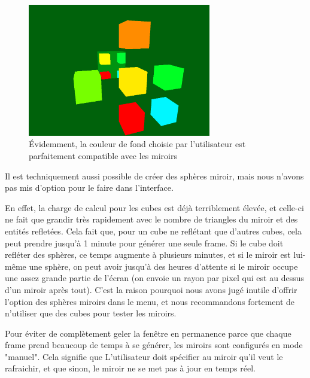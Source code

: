 \begin{figure}[h]
	\centering
	\includegraphics[width=8cm]{fig/CubeReflectionBackground.png}
	\caption{Évidemment, la couleur de fond choisie par l'utilisateur est parfaitement compatible avec les miroirs}
	\label{fig:propriete}
\end{figure}

\smallskip

Il est techniquement aussi possible de créer des sphères miroir, mais nous n'avons pas mis d'option pour le faire dans l'interface.

\smallskip

En effet, la charge de calcul pour les cubes est déjà terriblement élevée, et celle-ci ne fait que grandir très rapidement avec le nombre de triangles du miroir et des entités refletées. Cela fait que, pour un cube ne reflétant que d'autres cubes, cela peut prendre jusqu'à 1 minute pour générer une seule frame. Si le cube doit refléter des sphères, ce temps augmente à plusieurs minutes, et si le miroir est lui-même une sphère, on peut avoir jusqu'à des heures d'attente si le miroir occupe une assez grande partie de l'écran (on envoie un rayon par pixel qui est au dessus d'un miroir après tout). C'est la raison pourquoi nous avons jugé inutile d'offrir l'option des sphères miroirs dans le menu, et nous recommandons fortement de n'utiliser que des cubes pour tester les miroirs.

\smallskip

Pour éviter de complètement geler la fenêtre en permanence parce que chaque frame prend beaucoup de temps à se générer, les miroirs sont configurés en mode "manuel". Cela signifie que L'utilisateur doit spécifier au miroir qu'il veut le rafraichir, et que sinon, le miroir ne se met pas à jour en temps réel.

